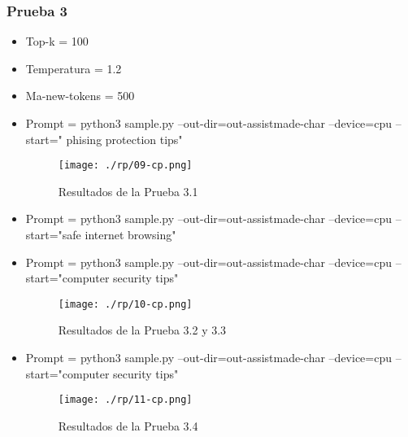 \subsubsection{ Prueba 3}\label{section:Prueba 3 mol 2}
    \begin{itemize}
        \item   Top-k = 100
        \item   Temperatura = 1.2
        \item   Ma-new-tokens = 500
            \item   Prompt = python3 sample.py --out-dir=out-assistmade-char --device=cpu --start=" phising protection tips"
            \begin{figure}[H]
              \centering %
                  \texttt{[image: ./rp/09-cp.png]} 
              \caption{Resultados de la Prueba 3.1\cite{}}
            \label{figure:Result Prueba 3 mod 2}  %
            \end{figure}
            \item   Prompt = python3 sample.py --out-dir=out-assistmade-char --device=cpu --start="safe internet browsing"
            \item   Prompt = python3 sample.py --out-dir=out-assistmade-char --device=cpu --start="computer security tips"
            \begin{figure}[H]
              \centering %
                  \texttt{[image: ./rp/10-cp.png]} 
              \caption{Resultados de la Prueba 3.2 y 3.3\cite{}}
            \label{figure:Resultado 3.2}  %
            \end{figure}
            \item   Prompt = python3 sample.py --out-dir=out-assistmade-char --device=cpu --start="computer security tips"
            \begin{figure}[H]
              \centering %
                  \texttt{[image: ./rp/11-cp.png]} 
              \caption{Resultados de la Prueba 3.4\cite{}}
            \label{figure:Resultado 3.4}  %
            \end{figure}
    \end{itemize}
